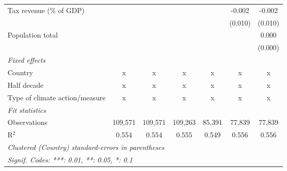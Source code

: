 \begin{tabular}{lcccccc}
   Tax revenue (\% of GDP)               &         &               &               &                & -0.002         & -0.002\\   
                                         &         &               &               &                & (0.010)        & (0.010)\\   
   Population total                      &         &               &               &                &                & 0.000\\   
                                         &         &               &               &                &                & (0.000)\\   
   \emph{Fixed effects}\\
   Country                               & x       & x             & x             & x              & x              & x\\  
   Half decade                           & x       & x             & x             & x              & x              & x\\  
   Type of climate action/measure        & x       & x             & x             & x              & x              & x\\  
   \midrule \emph{Fit statistics}\\
   Observations                          & 109,571 & 109,571       & 109,263       & 85,391         & 77,839         & 77,839\\  
   R$^2$                                 & 0.554   & 0.554         & 0.555         & 0.549          & 0.556          & 0.556\\  
   \midrule
   \multicolumn{7}{l}{\emph{Clustered (Country) standard-errors in parentheses}}\\
   \multicolumn{7}{l}{\emph{Signif. Codes: ***: 0.01, **: 0.05, *: 0.1}}\\
\end{tabular}
\par\endgroup


